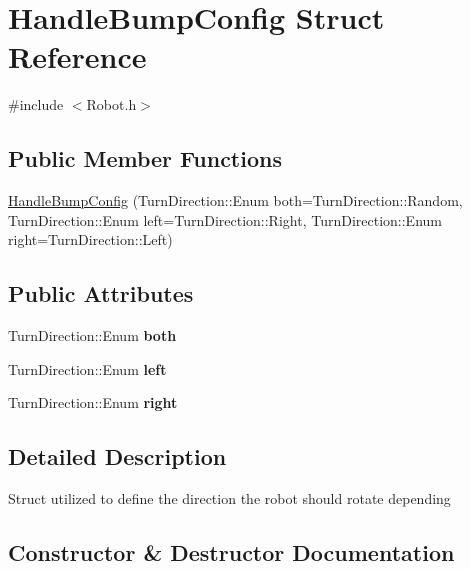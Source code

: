 \hypertarget{structHandleBumpConfig}{}\section{Handle\+Bump\+Config Struct Reference}
\label{structHandleBumpConfig}


{\ttfamily \#include $<$Robot.\+h$>$}

\subsection*{Public Member Functions}
\begin{DoxyCompactItemize}
\item 
\hyperlink{structHandleBumpConfig_a087d0372f08d710d3d93430cff3322ce}{Handle\+Bump\+Config} (Turn\+Direction\+::\+Enum both=Turn\+Direction\+::\+Random, Turn\+Direction\+::\+Enum left=Turn\+Direction\+::\+Right, Turn\+Direction\+::\+Enum right=Turn\+Direction\+::\+Left)
\end{DoxyCompactItemize}
\subsection*{Public Attributes}
\begin{DoxyCompactItemize}
\item 
\mbox{\label{structHandleBumpConfig_a9c3c43d0add0d93a1ff6ff9428abaa19}} 
Turn\+Direction\+::\+Enum {\bfseries both}
\item 
\mbox{\label{structHandleBumpConfig_aa7950ff5fe8ab88916e26361cf017949}} 
Turn\+Direction\+::\+Enum {\bfseries left}
\item 
\mbox{\label{structHandleBumpConfig_a4328fe801ccfaf623a1f45aea7f073d4}} 
Turn\+Direction\+::\+Enum {\bfseries right}
\end{DoxyCompactItemize}


\subsection{Detailed Description}
Struct utilized to define the direction the robot should rotate depending 

\subsection{Constructor \& Destructor Documentation}
\mbox{\label{structHandleBumpConfig_a087d0372f08d710d3d93430cff3322ce}} 

